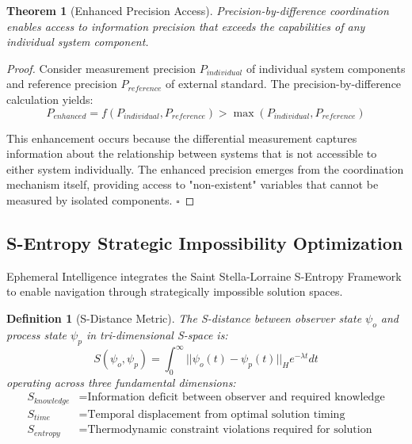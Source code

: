 \documentclass[12pt,a4paper]{article}
\newtheorem{theorem}{Theorem}
\newtheorem{definition}{Definition}
\begin{document}
\begin{theorem}[Enhanced Precision Access]
Precision-by-difference coordination enables access to information precision that exceeds the capabilities of any individual system component.
\end{theorem}

\begin{proof}
Consider measurement precision $P_{individual}$ of individual system components and reference precision $P_{reference}$ of external standard. The precision-by-difference calculation yields:
\begin{equation}
P_{enhanced} = f(P_{individual}, P_{reference}) > \max(P_{individual}, P_{reference})
\end{equation}

This enhancement occurs because the differential measurement captures information about the relationship between systems that is not accessible to either system individually. The enhanced precision emerges from the coordination mechanism itself, providing access to "non-existent" variables that cannot be measured by isolated components. $\square$
\end{proof}

\subsection{S-Entropy Strategic Impossibility Optimization}

Ephemeral Intelligence integrates the Saint Stella-Lorraine S-Entropy Framework to enable navigation through strategically impossible solution spaces.

\begin{definition}[S-Distance Metric]
The S-distance between observer state $\psi_o$ and process state $\psi_p$ in tri-dimensional S-space is:
\begin{equation}
S(\psi_o, \psi_p) = \int_0^\infty ||\psi_o(t) - \psi_p(t)||_H e^{-\lambda t} dt
\end{equation}
operating across three fundamental dimensions:
\begin{align}
S_{knowledge} &= \text{Information deficit between observer and required knowledge} \\
S_{time} &= \text{Temporal displacement from optimal solution timing} \\
S_{entropy} &= \text{Thermodynamic constraint violations required for solution}
\end{align}
\end{definition}
\end{document}
